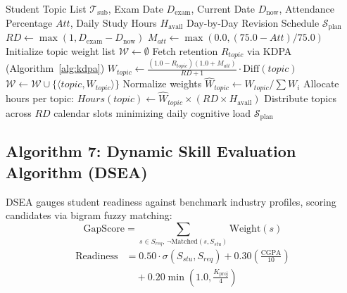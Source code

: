 \documentclass[conference]{IEEEtran}
\begin{document}
\begin{algorithm}[htbp]
\caption{Adaptive Learning Roadmap Algorithm (ALRA)}
\label{alg:alra}
\begin{algorithmic}[1]
\REQUIRE Student Topic List $\mathcal{T}_{\text{sub}}$, Exam Date $D_{\text{exam}}$, Current Date $D_{\text{now}}$, Attendance Percentage $Att$, Daily Study Hours $H_{\text{avail}}$
\ENSURE Day-by-Day Revision Schedule $\mathcal{S}_{\text{plan}}$
\STATE $RD \leftarrow \max(1, D_{\text{exam}} - D_{\text{now}})$
\STATE $M_{att} \leftarrow \max(0.0, (75.0 - Att) / 75.0)$
\STATE Initialize topic weight list $\mathcal{W} \leftarrow \emptyset$
    \STATE Fetch retention $R_{topic}$ via KDPA (Algorithm~\ref{alg:kdpa})
    \STATE $W_{topic} \leftarrow \frac{(1.0 - R_{topic})(1.0 + M_{att})}{RD + 1} \cdot \mathrm{Diff}(topic)$
    \STATE $\mathcal{W} \leftarrow \mathcal{W} \cup \{\langle topic, W_{topic} \rangle\}$
\ENDFOR
\STATE Normalize weights $\hat{W}_{topic} \leftarrow W_{topic} / \sum W_i$
\STATE Allocate hours per topic: $Hours(topic) \leftarrow \hat{W}_{topic} \times (RD \times H_{\text{avail}})$
\STATE Distribute topics across $RD$ calendar slots minimizing daily cognitive load
\RETURN $\mathcal{S}_{\text{plan}}$
\end{algorithmic}
\end{algorithm}

\subsection{Algorithm 7: Dynamic Skill Evaluation Algorithm (DSEA)}
DSEA gauges student readiness against benchmark industry profiles, scoring candidates via bigram fuzzy matching:
\begin{equation}
\text{GapScore} = \sum_{s \in S_{req}, \, \neg \mathrm{Matched}(s, S_{stu})} \text{Weight}(s)
\end{equation}
\begin{equation}
\begin{aligned}
\text{Readiness} &= 0.50 \cdot \sigma(S_{stu}, S_{req}) + 0.30 \left( \frac{\text{CGPA}}{10} \right) \\
&\quad + 0.20 \min\left( 1.0, \frac{K_{\text{proj}}}{4} \right)
\end{aligned}
\label{eq:readiness}
\end{equation}
\end{document}
